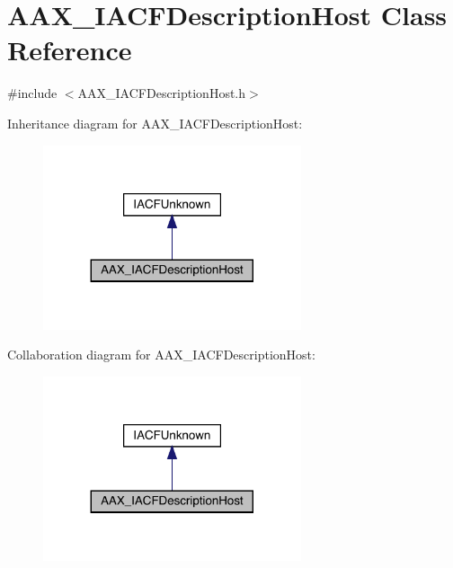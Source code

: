 \hypertarget{a01649}{}\section{A\+A\+X\+\_\+\+I\+A\+C\+F\+Description\+Host Class Reference}
\label{a01649}


{\ttfamily \#include $<$A\+A\+X\+\_\+\+I\+A\+C\+F\+Description\+Host.\+h$>$}



Inheritance diagram for A\+A\+X\+\_\+\+I\+A\+C\+F\+Description\+Host\+:
\nopagebreak
\begin{figure}[H]
\begin{center}
\leavevmode
\includegraphics[width=215pt]{a01648}
\end{center}
\end{figure}


Collaboration diagram for A\+A\+X\+\_\+\+I\+A\+C\+F\+Description\+Host\+:
\nopagebreak
\begin{figure}[H]
\begin{center}
\leavevmode
\includegraphics[width=215pt]{a01647}
\end{center}
\end{figure}


